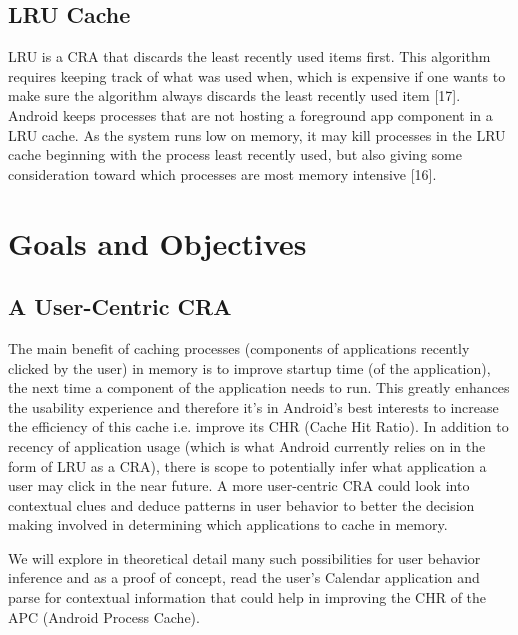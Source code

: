\documentclass[12pt]{uthesis-v12}  %
\begin{document}
		\subsection{LRU Cache}
			LRU is a CRA that discards the least recently used items first. This algorithm requires keeping track of what was used when, which is expensive if one wants to make sure the algorithm always discards the least recently used item [17]. Android keeps processes that are not hosting a foreground app component in a LRU cache. As the system runs low on memory, it may kill processes in the LRU cache beginning with the process least recently used, but also giving some consideration toward which processes are most memory intensive [16].
			
	\section{Goals and Objectives}
		
		\subsection{A User-Centric CRA}
			The main benefit of caching processes (components of applications recently clicked by the user) in memory is to improve startup time (of the application), the next time a component of the application needs to run. This greatly enhances the usability experience and therefore it's in Android's best interests to increase the efficiency of this cache i.e. improve its CHR (Cache Hit Ratio). In addition to recency of application usage (which is what Android currently relies on in the form of LRU as a CRA), there is scope to potentially infer what application a user may click in the near future. A more user-centric CRA could look into contextual clues and deduce patterns in user behavior to better the decision making involved in determining which applications to cache in memory.
			
			We will explore in theoretical detail many such possibilities for user behavior inference and as a proof of concept, read the user's Calendar  application and parse for contextual information that could help in improving the CHR of the APC (Android Process Cache). 
\end{document}
